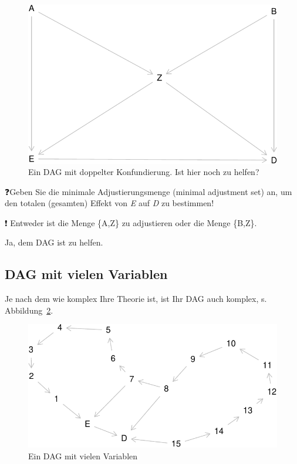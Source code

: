 \documentclass[
  a4paper,
  DIV=11]{scrreprt}
\theoremstyle{definition}
\theoremstyle{remark}
\begin{document}
\begin{figure}

{\centering \includegraphics{./abschluss_files/figure-pdf/fig-dag-wild-1.pdf}

}

\caption{\label{fig-dag-wild}Ein DAG mit doppelter Konfundierung. Ist
hier noch zu helfen?}

\end{figure}

❓Geben Sie die minimale Adjustierungsmenge (minimal adjustment set) an,
um den totalen (gesamten) Effekt von \emph{E} auf \emph{D} zu bestimmen!

❗ Entweder ist die Menge \{A,Z\} zu adjustieren oder die Menge \{B,Z\}.

Ja, dem DAG ist zu helfen.

\hypertarget{dag-mit-vielen-variablen}{%
\subsection{DAG mit vielen Variablen}\label{dag-mit-vielen-variablen}}

Je nach dem wie komplex Ihre Theorie ist, ist Ihr DAG auch komplex, s.
Abbildung~\ref{fig-dag-komplex}.

\begin{figure}

{\centering \includegraphics{./abschluss_files/figure-pdf/fig-dag-komplex-1.pdf}

}

\caption{\label{fig-dag-komplex}Ein DAG mit vielen Variablen}

\end{figure}
\end{document}
